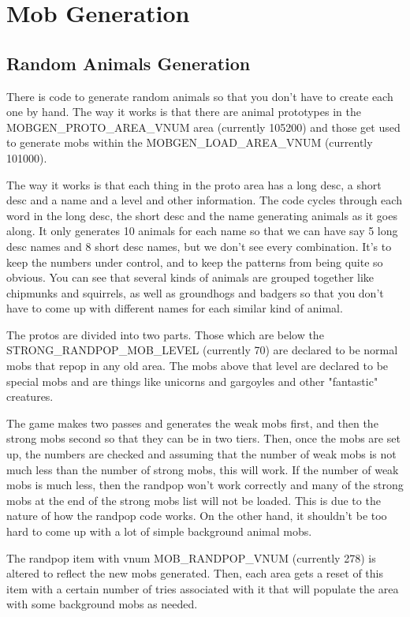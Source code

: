 \chapter{Mob Generation}

\section{Random Animals Generation}

There is code to generate random animals so that you don't have
to create each one by hand. The way it works is that there are animal
prototypes in the MOBGEN\_PROTO\_AREA\_VNUM area (currently 105200)
and those get used to generate mobs within the MOBGEN\_LOAD\_AREA\_VNUM
(currently 101000). 

The way it works is that each thing in the proto area has a long
desc, a short desc and a name and a level and other information.
The code cycles through each word in the long desc, the short desc
and the name generating animals as it goes along. It only generates
10 animals for each name so that we can have say 5 long desc names and
8 short desc names, but we don't see every combination. It's to keep
the numbers under control, and to keep the patterns from being
quite so obvious. You can see that several kinds of animals are
grouped together like chipmunks and squirrels, as well as
groundhogs and badgers so that you don't have to come up with
different names for each similar kind of animal.

The protos are divided into two parts. Those which are below the
STRONG\_RANDPOP\_MOB\_LEVEL (currently 70) are declared to be
normal mobs that repop in any old area. The mobs above that level
are declared to be special mobs and are things like unicorns and
gargoyles and other "fantastic" creatures.

The game makes two passes and generates the weak mobs first, and
then the strong mobs second so that they can be in two tiers. Then,
once the mobs are set up, the numbers are checked and assuming that
the number of weak mobs is not much less than the number of strong
mobs, this will work. If the number of weak mobs is much less, then
the randpop won't work correctly and many of the strong mobs at
the end of the strong mobs list will not be loaded. This is due to the
nature of how the randpop code works. On the other hand, it shouldn't
be too hard to come up with a lot of simple background animal mobs.

The randpop item with vnum MOB\_RANDPOP\_VNUM (currently 278) is
altered to reflect the new mobs generated. Then, each area gets
a reset of this item with a certain number of tries associated
with it that will populate the area with some background mobs as
needed. 

